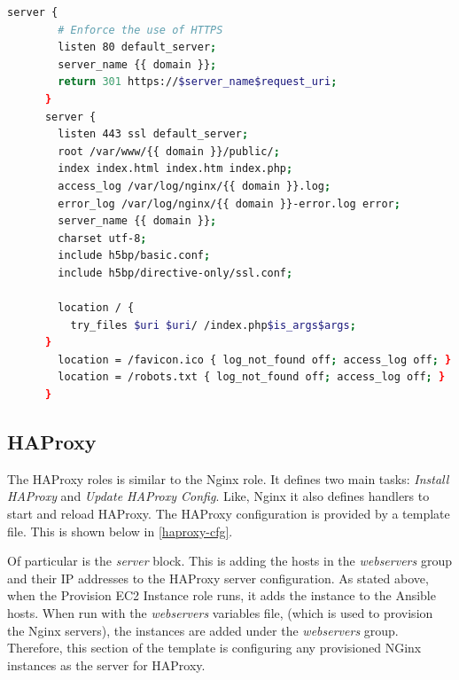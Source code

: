 \documentclass[a4paper]{article}
\begin{document}
 		\begin{minipage}{\textwidth}
      \begin{lstlisting}[caption={nginx/templates/serverforhacker.com.conf.j2},label=nginx-conf-template,language=bash]
      server {
        # Enforce the use of HTTPS
        listen 80 default_server;
        server_name {{ domain }};
        return 301 https://$server_name$request_uri;
      }
      server {
        listen 443 ssl default_server;
        root /var/www/{{ domain }}/public/;
        index index.html index.htm index.php;
        access_log /var/log/nginx/{{ domain }}.log;
        error_log /var/log/nginx/{{ domain }}-error.log error;
        server_name {{ domain }};
        charset utf-8;
        include h5bp/basic.conf;
        include h5bp/directive-only/ssl.conf;
        
        location / {
          try_files $uri $uri/ /index.php$is_args$args;
      }
        location = /favicon.ico { log_not_found off; access_log off; }
        location = /robots.txt { log_not_found off; access_log off; }
      }
      \end{lstlisting}
    \end{minipage}
    
    \subsection{HAProxy}
    The HAProxy roles is similar to the Nginx role. It defines two main tasks: \textit{Install HAProxy} and \textit{Update HAProxy Config}. Like, Nginx it also defines handlers to start and reload HAProxy. The HAProxy 
    configuration is provided by a template file. This is shown below in \autoref{haproxy-cfg}.
    
    Of particular is the \textit{server} block. This is adding the hosts in the \textit{webservers} group and their IP addresses to the HAProxy server configuration. As stated above, when the Provision EC2 Instance role runs, it adds the instance to the Ansible hosts. When run with the \textit{webservers} variables file, (which is used to provision the Nginx servers), the instances are added under the \textit{webservers} group. Therefore, this section of the template is configuring any provisioned NGinx instances as the server for HAProxy.
    
\end{document}
